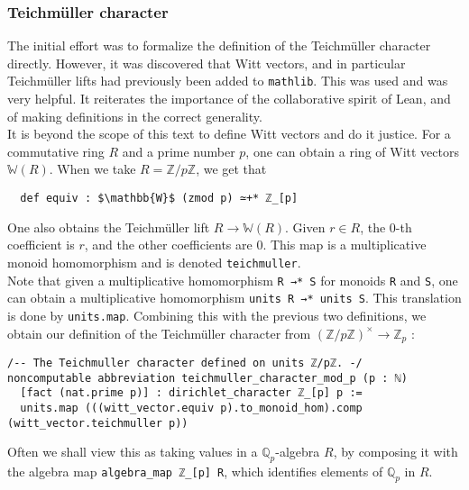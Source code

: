 \documentclass[11pt]{article}
\newcommand{\lean}[1]{\texttt{#1}\xspace} %
\begin{document}
\subsubsection{Teichmüller character}
The initial effort was to formalize the definition of the Teichmüller character directly. 
However, it was discovered that Witt vectors, and in particular Teichmüller lifts had previously 
been added to \texttt{mathlib}. This was used and was very helpful. It reiterates the importance 
of the collaborative spirit of Lean, and of making definitions in the correct generality. \\

It is beyond the scope of this text to define Witt vectors and do it justice. For a commutative ring
$R$ and a prime number $p$, one can obtain a ring of Witt vectors $\mathbb{W}(R)$.
When we take $R = \mathbb{Z}/p \mathbb{Z}$, we get that

\begin{lstlisting}
  def equiv : $\mathbb{W}$ (zmod p) ≃+* ℤ_[p]
\end{lstlisting}

One also obtains the Teichmüller lift $R \to \mathbb{W} (R)$. Given $r \in R$, 
the 0-th coefficient is $r$, and the other coefficients are 0. This map is a 
multiplicative monoid homomorphism and is denoted \lean{teichmuller}. \\

Note that given a multiplicative homomorphism \lean{R →* S} for monoids \lean{R} 
and \lean{S}, one can obtain a multiplicative homomorphism \lean{units R →* units S}. 
This translation is done by \lean{units.map}. Combining this with the previous two 
definitions, we obtain our definition of the Teichmüller character from 
$(\mathbb{Z}/p \mathbb{Z})^{\times} \to \mathbb{Z}_p$ :
\begin{lstlisting}
/-- The Teichmuller character defined on units ℤ/pℤ. -/
noncomputable abbreviation teichmuller_character_mod_p (p : ℕ) 
  [fact (nat.prime p)] : dirichlet_character ℤ_[p] p :=
  units.map (((witt_vector.equiv p).to_monoid_hom).comp (witt_vector.teichmuller p))
\end{lstlisting}

Often we shall view this as taking values in a $\mathbb{Q}_p$-algebra $R$, by composing it 
with the algebra map \lean{algebra\_map ℤ\_[p] R}, which identifies elements of $\mathbb{Q}_p$ 
in $R$. \\
\end{document}

